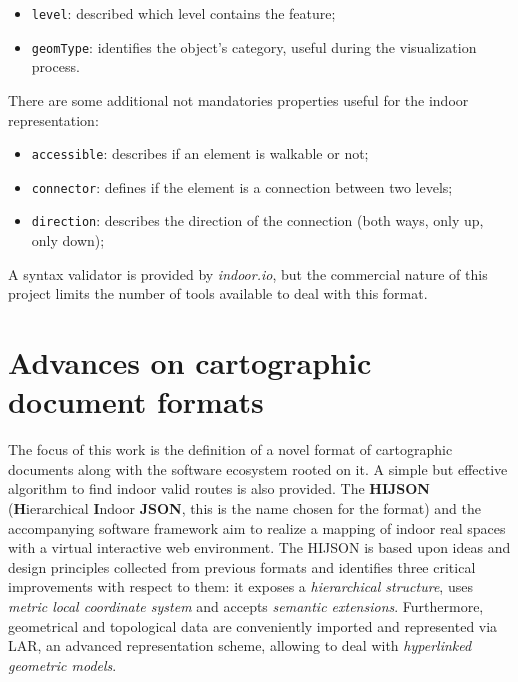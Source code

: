 \documentclass{sig-alternate}
\begin{document}
\begin{itemize}
\itemsep1pt\parskip0pt
\item
  \texttt{level}: described which level contains the feature;
\item
  \texttt{geomType}: identifies the object's
  category, useful during the visualization
  process.
\end{itemize}

There are some additional not mandatories properties useful for
the indoor representation:

\begin{itemize}
\itemsep1pt\parskip0pt
\item
  \texttt{accessible}: describes if an element is walkable or not;
\item
  \texttt{connector}: defines if the element is a connection between two
  levels;
\item
  \texttt{direction}: describes the direction of the connection (both
  ways, only up, only down);
\end{itemize}

A syntax validator is provided by \emph{indoor.io}, but the commercial nature
of  this project limits the number of tools available to deal with this
format.

\section{Advances on cartographic document formats}\label{advances-on-cartographic-document-format}

The focus of this work is the definition of a novel format of cartographic
documents along with the software ecosystem rooted on it. A simple but
effective  algorithm to find indoor valid routes is also provided. The
\textbf{HIJSON} (\textbf{H}ierarchical \textbf{I}ndoor \textbf{JSON}, this is
the name chosen for the format) and the accompanying software framework aim
to realize a mapping of indoor real spaces with a virtual interactive web
environment. The HIJSON is based upon ideas and design principles collected
from previous formats and identifies three critical improvements with respect
to them: it exposes a \emph{hierarchical structure}, uses \emph{metric local
coordinate system} and accepts \emph{semantic extensions}. Furthermore, geometrical 
and topological data are conveniently imported and represented via LAR, an advanced 
representation scheme, allowing to deal with \emph{hyperlinked geometric models}.
\end{document}
